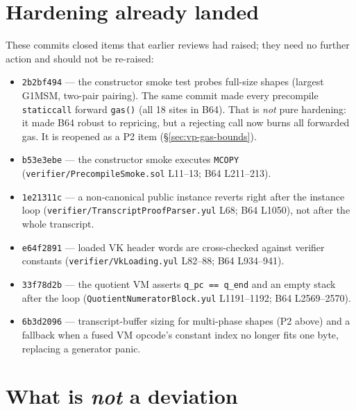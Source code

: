 \section{Hardening already landed}
\label{sec:roadmap-landed}

These commits closed items that earlier reviews had raised; they need no
further action and should not be re-raised:
\begin{itemize}[leftmargin=1.4em,itemsep=1pt]
  \item \texttt{2b2bf494} --- the constructor smoke test probes
        full-size shapes (largest G1MSM, two-pair pairing). The same
        commit made every precompile \texttt{staticcall} forward
        \texttt{gas()} (all 18 sites in B64). That is \emph{not} pure
        hardening: it made B64 robust to repricing, but a rejecting call
        now burns all forwarded gas. It is reopened as a P2 item
        (\S\ref{sec:vp-gas-bounds}).
  \item \texttt{b53e3ebe} --- the constructor smoke executes
        \texttt{MCOPY} (\texttt{verifier/\allowbreak{}PrecompileSmoke.sol} L11--13;
        B64 L211--213).
  \item \texttt{1e21311c} --- a non-canonical public instance reverts
        right after the instance loop
        (\texttt{verifier/\allowbreak{}TranscriptProofParser.yul} L68; B64 L1050),
        not after the whole transcript.
  \item \texttt{e64f2891} --- loaded VK header words are cross-checked
        against verifier constants (\texttt{verifier/\allowbreak{}VkLoading.yul}
        L82--88; B64 L934--941).
  \item \texttt{33f78d2b} --- the quotient VM asserts
        \texttt{q\_pc == q\_end} and an empty stack after the loop
        (\texttt{QuotientNumerator\allowbreak{}Block.yul} L1191--1192; B64
        L2569--2570).
  \item \texttt{6b3d2096} --- transcript-buffer sizing for multi-phase
        shapes (P2 above) and a fallback when a fused VM opcode's
        constant index no longer fits one byte, replacing a generator
        panic.
\end{itemize}

\section{What is \emph{not} a deviation}
\label{sec:roadmap-not-deviation}

